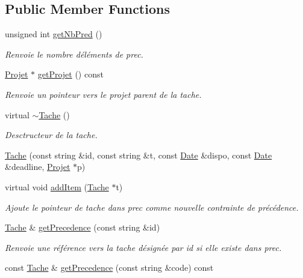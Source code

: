 \subsection*{Public Member Functions}
\begin{DoxyCompactItemize}
\item 
unsigned int \hyperlink{class_tache_ac597ce580ad0b32c373b329d4da839ad}{get\+Nb\+Pred} ()
\begin{DoxyCompactList}\small\item\em Renvoie le nombre d\textquotesingle{}éléments de prec. \end{DoxyCompactList}\item 
\hyperlink{class_projet}{Projet} $\ast$ \hyperlink{class_tache_aa6d1abc3712b5a8b571bb3c131129ac7}{get\+Projet} () const 
\begin{DoxyCompactList}\small\item\em Renvoie un pointeur vers le projet parent de la tache. \end{DoxyCompactList}\item 
virtual \hyperlink{class_tache_acefc2a88516ef4d8bd7b25afcf769e9c}{$\sim$\+Tache} ()
\begin{DoxyCompactList}\small\item\em Desctructeur de la tache. \end{DoxyCompactList}\item 
\hyperlink{class_tache_a026b068c4e49643d6fec30c9b915ddca}{Tache} (const string \&id, const string \&t, const \hyperlink{class_t_i_m_e_1_1_date}{Date} \&dispo, const \hyperlink{class_t_i_m_e_1_1_date}{Date} \&deadline, \hyperlink{class_projet}{Projet} $\ast$p)
\item 
virtual void \hyperlink{class_tache_a6a13b4138a46f22e632bf9d35f155c09}{add\+Item} (\hyperlink{class_tache}{Tache} $\ast$t)
\begin{DoxyCompactList}\small\item\em Ajoute le pointeur de tache dans prec comme nouvelle contrainte de précédence. \end{DoxyCompactList}\item 
\hyperlink{class_tache}{Tache} \& \hyperlink{class_tache_ab29bfb6c79337fbc9dc5618195f12f8d}{get\+Precedence} (const string \&id)
\begin{DoxyCompactList}\small\item\em Renvoie une référence vers la tache désignée par id si elle existe dans prec. \end{DoxyCompactList}\item 
const \hyperlink{class_tache}{Tache} \& \hyperlink{class_tache_af995526e12eed76ffa2a4ba7b6fb7a90}{get\+Precedence} (const string \&code) const 

\end{DoxyCompactItemize}
